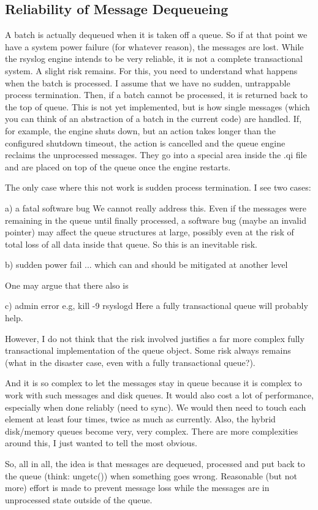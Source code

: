 \documentclass[a4paper,10pt]{article}
\begin{document}
\subsection{Reliability of Message Dequeueing}
A batch is actually dequeued when it is taken off a queue. So if at that point we
have a system power failure (for whatever reason), the messages are lost.
While the rsyslog engine intends to be very reliable, it is not a complete
transactional system. A slight risk remains. For this, you need to understand
what happens when the batch is processed. I assume that we have no sudden,
untrappable process termination. Then, if a batch cannot be processed, it is
returned back to the top of queue. This is not yet implemented, but is how
single messages (which you can think of an abstraction of a batch in the
current code) are handled. If, for example, the engine shuts down, but an
action takes longer than the configured shutdown timeout, the action is
cancelled and the queue engine reclaims the unprocessed messages. They go
into a special area inside the .qi file and are placed on top of the queue
once the engine restarts.

The only case where this not work is sudden process termination. I see two
cases:

a) a fatal software bug
We cannot really address this. Even if the messages were remaining in the
queue until finally processed, a software bug (maybe an invalid pointer) may
affect the queue structures at large, possibly even at the risk of total loss
of all data inside that queue. So this is an inevitable risk.

b) sudden power fail
... which can and should be mitigated at another level

One may argue that there also is

c) admin error
e.g, kill -9 rsyslogd
Here a fully transactional queue will probably help.

However, I do not think that the risk involved justifies a far more complex
fully transactional implementation of the queue object. Some risk always
remains (what in the disaster case, even with a fully transactional queue?).

And it is so complex to let the messages stay in queue because it is complex
to work with such messages and disk queues. It would also cost a lot of
performance, especially when done reliably (need to sync). We would then need
to touch each element at least four times, twice as much as currently. Also,
the hybrid disk/memory queues become very, very complex. There are more
complexities around this, I just wanted to tell the most obvious.

So, all in all, the idea is that messages are dequeued, processed and put
back to the queue (think: ungetc()) when something goes wrong. Reasonable
(but not more) effort is made to prevent message loss while the messages are
in unprocessed state outside of the queue.
\end{document}
